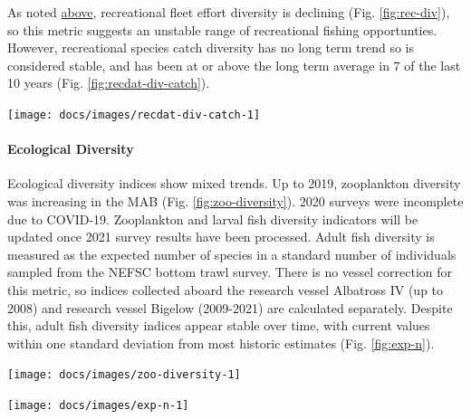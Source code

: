 \documentclass[
  10pt,
]{article}
\let\origfigure\figure
\let\endorigfigure\endfigure
\renewenvironment{figure}[1][2] {
    \expandafter\origfigure\expandafter[H]
} {
    \endorigfigure
}
\begin{document}
As noted \protect\hyperlink{recreational-opportunities}{above},
recreational fleet effort diversity is declining (Fig.
\ref{fig:rec-div}), so this metric suggests an unstable range of
recreational fishing opportunties. However, recreational species catch
diversity has no long term trend so is considered stable, and has been
at or above the long term average in 7 of the last 10 years (Fig.
\ref{fig:recdat-div-catch}).

\begin{figure}

{\centering \texttt{[image: docs/images/recdat-div-catch-1]} 

}

\caption{Diversity of recreational catch in the Mid-Atlantic.}\label{fig:recdat-div-catch}
\end{figure}

\hypertarget{ecological-diversity}{%
\paragraph{Ecological Diversity}\label{ecological-diversity}}

Ecological diversity indices show mixed trends. Up to 2019, zooplankton
diversity was increasing in the MAB (Fig. \ref{fig:zoo-diversity}). 2020
surveys were incomplete due to COVID-19. Zooplankton and larval fish
diversity indicators will be updated once 2021 survey results have been
processed. Adult fish diversity is measured as the expected number of
species in a standard number of individuals sampled from the NEFSC
bottom trawl survey. There is no vessel correction for this metric, so
indices collected aboard the research vessel Albatross IV (up to 2008)
and research vessel Bigelow (2009-2021) are calculated separately.
Despite this, adult fish diversity indices appear stable over time, with
current values within one standard deviation from most historic
estimates (Fig. \ref{fig:exp-n}).

\begin{figure}

{\centering \texttt{[image: docs/images/zoo-diversity-1]} 

}

\caption{Zooplankton diversity in the Mid-Atlantic Bight up to 2019, based on Shannon diversity index.}\label{fig:zoo-diversity}
\end{figure}

\begin{figure}

{\centering \texttt{[image: docs/images/exp-n-1]} 

}

\caption{Adult fish diversity in the Mid-Atlantic Bight, based on expected number of species. Results from survey vessels Albatross and Bigelow are reported separately due to catchability differences.}\label{fig:exp-n}
\end{figure}
\end{document}
